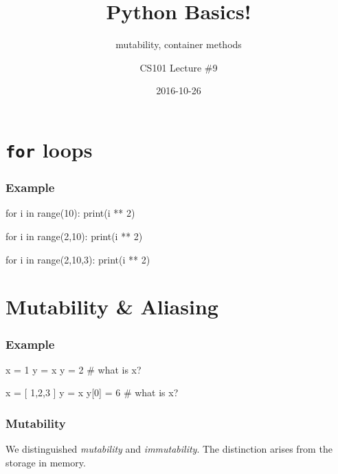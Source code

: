 \documentclass[11pt]{beamer}
\title{Python Basics!}
\subtitle{mutability, container methods}
\author{CS101 Lecture \#9}
\date{2016-10-26}
\begin{document}
  \setcounter{showProgressBar}{0}
  \setcounter{showSlideNumbers}{0}

\frame{\titlepage}

\setcounter{framenumber}{0}
\setcounter{showProgressBar}{1}
\setcounter{showSlideNumbers}{1}


\section{\texttt{for} loops}

\begin{frame}[fragile]
  \frametitle{Example}
  \Enlarge

  \begin{semiverbatim}
for i in range(10):
    print(i ** 2) \pause

for i in range(2,10):
    print(i ** 2) \pause

for i in range(2,10,3):
    print(i ** 2)

  \end{semiverbatim}
\end{frame}

\section{Mutability \& Aliasing}

\begin{frame}[fragile]
  \frametitle{Example}
  \Enlarge

  \begin{semiverbatim}
x = 1
y = x
y = 2
# what is x? %

x = [ 1,2,3 ]
y = x
y[0] = 6
# what is x?
  \end{semiverbatim}
\end{frame}

\begin{frame}[fragile]
  \frametitle{Mutability}
  \Enlarge

  \begin{itemize}
  \myitem  We distinguished \emph{mutability} and \emph{immutability}. %
  \myitem  The distinction arises from the storage in memory.
  \end{itemize}
\end{frame}
\end{document}
